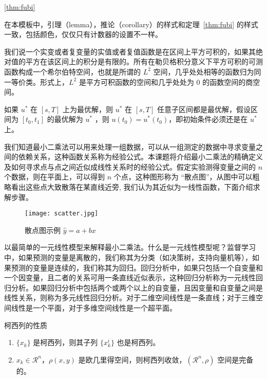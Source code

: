 \documentclass[lang=cn,10pt]{elegantbook}
\begin{document}
\ref{thm:fubi}

\begin{note}
在本模板中，引理（lemma），推论（corollary）的样式和定理~\ref{thm:fubi} 的样式一致，包括颜色，仅仅只有计数器的设置不一样。
\end{note}

我们说一个实变或者复变量的实值或者复值函数是在区间上平方可积的，如果其绝对值的平方在该区间上的积分是有限的。所有在勒贝格积分意义下平方可积的可测函数构成一个希尔伯特空间，也就是所谓的 $L^2$ 空间，几乎处处相等的函数归为同一等价类。形式上，$L^2$ 是平方可积函数的空间和几乎处处为 0 的函数空间的商空间。

\begin{proposition}[最优性原理] \label{pro:max}
如果 $u^*$ 在 $[s,T]$ 上为最优解，则 $u^*$ 在 $[s, T]$ 任意子区间都是最优解，假设区间为 $[t_0, t_1]$ 的最优解为 $u^*$ ，则 $u(t_0)=u^{*}(t_0)$，即初始条件必须还是在 $u^*$ 上。
\end{proposition}

我们知道最小二乘法可以用来处理一组数据，可以从一组测定的数据中寻求变量之间的依赖关系，这种函数关系称为经验公式。本课题将介绍最小二乘法的精确定义及如何寻求点与点之间近似成线性关系时的经验公式。假定实验测得变量之间的 $n$ 个数据，则在平面上，可以得到 $n$ 个点，这种图形称为 “散点图”，从图中可以粗略看出这些点大致散落在某直线近旁, 我们认为其近似为一线性函数，下面介绍求解步骤。

\begin{figure}[htbp]
  \centering
  \texttt{[image: scatter.jpg]}
  \caption{散点图示例 $\hat{y}=a+bx$ \label{fig:scatter}}
\end{figure}

以最简单的一元线性模型来解释最小二乘法。什么是一元线性模型呢？监督学习中，如果预测的变量是离散的，我们称其为分类（如决策树，支持向量机等），如果预测的变量是连续的，我们称其为回归。回归分析中，如果只包括一个自变量和一个因变量，且二者的关系可用一条直线近似表示，这种回归分析称为一元线性回归分析。如果回归分析中包括两个或两个以上的自变量，且因变量和自变量之间是线性关系，则称为多元线性回归分析。对于二维空间线性是一条直线；对于三维空间线性是一个平面，对于多维空间线性是一个超平面。

\begin{property}\label{property:cauchy}
柯西列的性质
\begin{enumerate}
\item $\{x_k\}$ 是柯西列，则其子列 $\{x_k^i\}$ 也是柯西列。
\item $x_k\in \mathcal{R}^n$，$\rho(x,y)$ 是欧几里得空间，则柯西列收敛，$(\mathcal{R}^n,\rho)$ 空间是完备的。
\end{enumerate}
\end{property}
\end{document}
